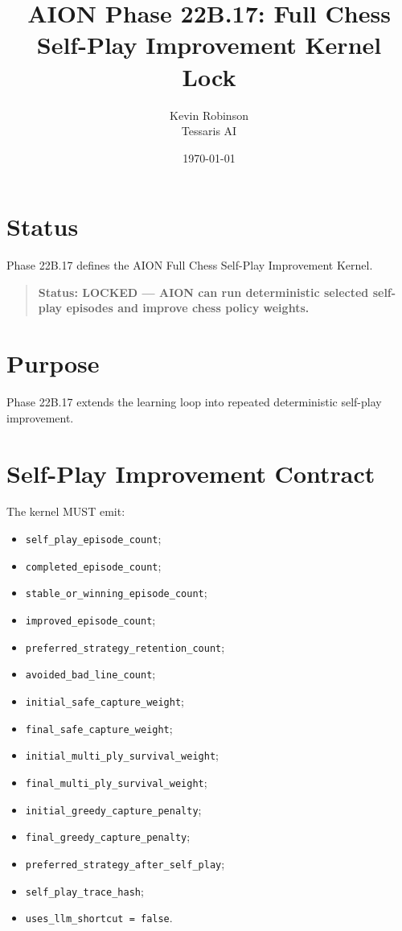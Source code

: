 \documentclass[11pt,a4paper]{article}
\title{\textbf{AION Phase 22B.17: Full Chess Self-Play Improvement Kernel Lock}}
\author{Kevin Robinson\\Tessaris AI}
\date{\today}
\begin{document}
\maketitle

\section{Status}

Phase 22B.17 defines the AION Full Chess Self-Play Improvement Kernel.

\begin{quote}
\textbf{Status: LOCKED --- AION can run deterministic selected self-play episodes and improve chess policy weights.}
\end{quote}

\section{Purpose}

Phase 22B.17 extends the learning loop into repeated deterministic self-play improvement.

\section{Self-Play Improvement Contract}

The kernel MUST emit:

\begin{itemize}
  \item \texttt{self\_play\_episode\_count};
  \item \texttt{completed\_episode\_count};
  \item \texttt{stable\_or\_winning\_episode\_count};
  \item \texttt{improved\_episode\_count};
  \item \texttt{preferred\_strategy\_retention\_count};
  \item \texttt{avoided\_bad\_line\_count};
  \item \texttt{initial\_safe\_capture\_weight};
  \item \texttt{final\_safe\_capture\_weight};
  \item \texttt{initial\_multi\_ply\_survival\_weight};
  \item \texttt{final\_multi\_ply\_survival\_weight};
  \item \texttt{initial\_greedy\_capture\_penalty};
  \item \texttt{final\_greedy\_capture\_penalty};
  \item \texttt{preferred\_strategy\_after\_self\_play};
  \item \texttt{self\_play\_trace\_hash};
  \item \texttt{uses\_llm\_shortcut = false}.
\end{itemize}
\end{document}
